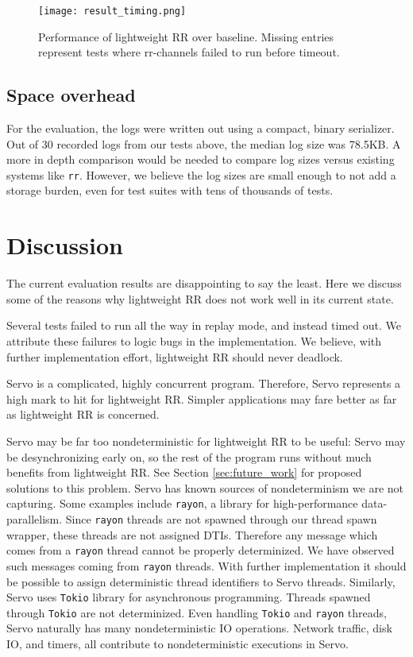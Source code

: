 \begin{figure}
  \texttt{[image: result\_timing.png]}
  \caption{Performance of lightweight RR over baseline. Missing entries represent
  tests where rr-channels failed to run before timeout.}
  \label{fig:result_timing}
\end{figure}

\subsection{Space overhead}
For the evaluation, the logs were written out using a compact, binary serializer.
Out of 30 recorded logs from our tests above, the median log size was 78.5KB.
A more in depth comparison would be needed to compare log sizes versus existing
systems like \texttt{rr}. However, we believe the log sizes are small enough to
not add a storage burden, even for test suites with tens of thousands of tests.

\section{Discussion}
\label{sec:discussion}
The current evaluation results are disappointing to say the least. Here we discuss
some of the reasons why lightweight RR does not work well in its current state.

Several tests failed to run all the way in replay mode, and instead timed out. We attribute
these failures to logic bugs in the implementation. We believe, with further implementation
effort, lightweight RR should never deadlock.

Servo is a complicated, highly concurrent program. Therefore, Servo represents a high
mark to hit for lightweight RR. Simpler applications may fare better as far as lightweight
RR is concerned.

Servo may be far too nondeterministic
for lightweight RR to be useful: Servo may be desynchronizing early on, so the rest of
the program runs without much benefits from lightweight RR.
See Section \ref{sec:future_work} for proposed solutions to this
problem. Servo has known sources of nondeterminism we are not capturing. Some examples
include \texttt{rayon}, a library for high-performance data-parallelism. Since \texttt{rayon} threads are
not spawned through our thread spawn wrapper, these threads are not assigned DTIs. Therefore any message which comes from a \texttt{rayon} thread cannot be properly determinized.
We have observed such messages coming from \texttt{rayon} threads.
With further implementation it should be possible to assign deterministic thread
identifiers to Servo threads. Similarly, Servo uses \texttt{Tokio} library for asynchronous programming. Threads spawned through \texttt{Tokio} are not determinized.
Even handling \texttt{Tokio} and \texttt{rayon} threads, Servo naturally has many nondeterministic IO operations. Network traffic, disk IO, and timers, all contribute to nondeterministic executions in Servo.

